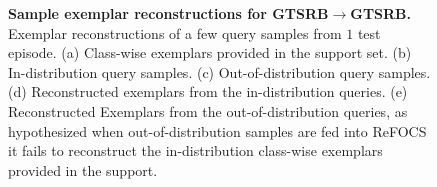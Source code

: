 \begin{figure}[!ht]
\centering
\captionsetup[subfigure]{justification=centering}
\hfill
{} 
\hfill
{} 
\hfill
{} 
	\hfill
{} 
	
\caption{\textbf{Sample exemplar reconstructions for GTSRB$\rightarrow$GTSRB.} Exemplar reconstructions of a few query samples from $1$ test episode. (a) Class-wise exemplars provided in the support set. (b) In-distribution query samples. (c) Out-of-distribution query samples. (d) Reconstructed exemplars from the in-distribution queries. (e) Reconstructed Exemplars from the out-of-distribution queries, as hypothesized when out-of-distribution samples are fed into ReFOCS it fails to reconstruct the in-distribution class-wise exemplars provided in the support.}
\label{fig:exemp_recon}
\end{figure}